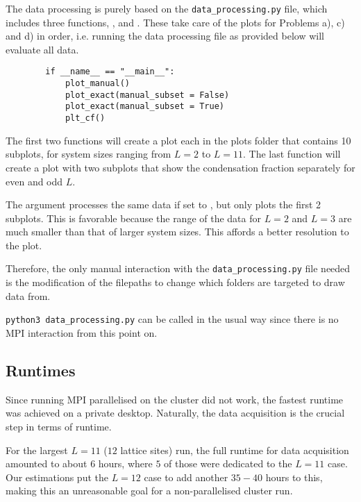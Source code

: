         The data processing is purely based on the \texttt{data\_processing.py} file, which includes three functions, ,  and . These take care of the plots for Problems a), c) and d) in order, i.e. running the data processing file as provided below will evaluate all data.

        \begin{verbatim}
        if __name__ == "__main__":
            plot_manual()
            plot_exact(manual_subset = False)
            plot_exact(manual_subset = True)
            plt_cf()
        \end{verbatim}

        The first two functions will create a plot each in the plots folder that contains 10 subplots, for system sizes ranging from $L=2$ to $L=11$. The last function will create a plot with two subplots that show the condensation fraction separately for even and odd $L$. 

        The argument  processes the same data if set to , but only plots the first 2 subplots. This is favorable because the range of the data for $L = 2$ and $L=3$ are much smaller than that of larger system sizes. This affords a better resolution to the plot.

        Therefore, the only manual interaction with the \texttt{data\_processing.py} file needed is the modification of the filepaths to change which folders are targeted to draw data from.

        \texttt{python3 data\_processing.py} can be called in the usual way since there is no MPI interaction from this point on.

    \subsection{Runtimes}
        Since running MPI parallelised on the cluster did not work, the fastest runtime was achieved on a private desktop. Naturally, the data acquisition is the crucial step in terms of runtime.

        For the largest $L=11$ ($12$ lattice sites) run, the full runtime for data acquisition amounted to about $6$ hours, where $5$ of those were dedicated to the $L=11$ case. Our estimations put the $L=12$ case to add another $35-40$ hours to this, making this an unreasonable goal for a non-parallelised cluster run.
        
